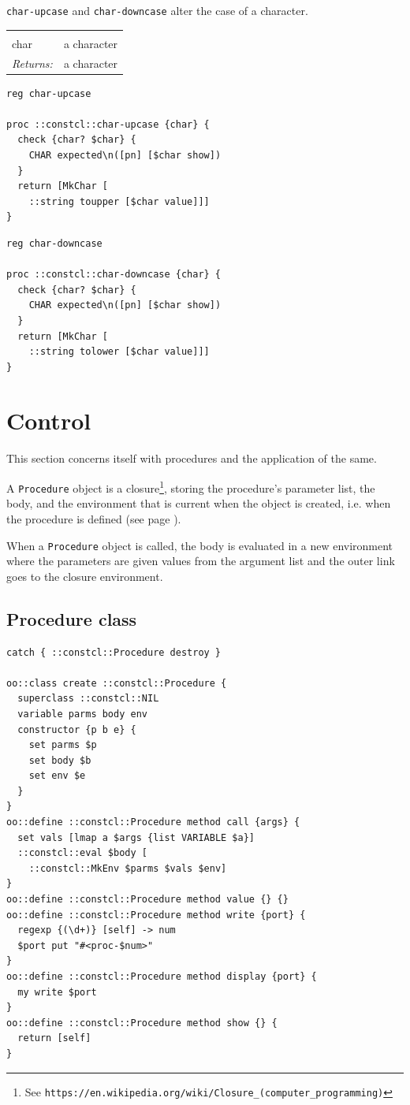 \documentclass[twoside,9pt]{report}
\begin{document}
\texttt{char-upcase} and \texttt{char-downcase} alter the case of a character.

\noindent\begin{tabular}{ |p{1.9cm} p{8cm}| }
\hline
\rowcolor[HTML]{CCCCCC} \multicolumn{2}{|l|}{\bf char-upcase, char-downcase (public)} \\
char & a character \\
\textit{Returns:} & a character \\
\hline
\end{tabular}
\begin{lstlisting}
reg char-upcase

proc ::constcl::char-upcase {char} {
  check {char? $char} {
    CHAR expected\n([pn] [$char show])
  }
  return [MkChar [
    ::string toupper [$char value]]]
}
\end{lstlisting}
\begin{lstlisting}
reg char-downcase

proc ::constcl::char-downcase {char} {
  check {char? $char} {
    CHAR expected\n([pn] [$char show])
  }
  return [MkChar [
    ::string tolower [$char value]]]
}
\end{lstlisting}
\section{Control}
\label{control}


This section concerns itself with procedures and the application of the same.


A \texttt{Procedure} object is a closure\footnote{See \texttt{https://en.wikipedia.org/wiki/Closure\_(computer\_programming)}}, storing the procedure's parameter list, the body, and the environment that is current when the object is created, i.e. when the procedure is defined (see page \pageref{procedure-definition}).


When a \texttt{Procedure} object is called, the body is evaluated in a new environment where the parameters are given values from the argument list and the outer link goes to the closure environment.

\subsection{Procedure class}
\label{procedure-class}
\begin{lstlisting}
catch { ::constcl::Procedure destroy }

oo::class create ::constcl::Procedure {
  superclass ::constcl::NIL
  variable parms body env
  constructor {p b e} {
    set parms $p
    set body $b
    set env $e
  }
}
oo::define ::constcl::Procedure method call {args} {
  set vals [lmap a $args {list VARIABLE $a}]
  ::constcl::eval $body [
    ::constcl::MkEnv $parms $vals $env]
}
oo::define ::constcl::Procedure method value {} {}
oo::define ::constcl::Procedure method write {port} {
  regexp {(\d+)} [self] -> num
  $port put "#<proc-$num>"
}
oo::define ::constcl::Procedure method display {port} {
  my write $port
}
oo::define ::constcl::Procedure method show {} {
  return [self]
}
\end{lstlisting}
\end{document}
